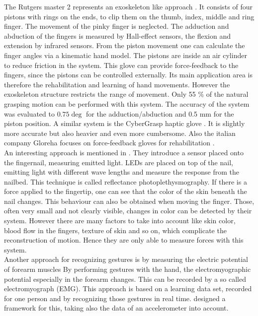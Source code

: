 {The Rutgers master {2} represents an exoskeleton like approach \cite{bouzit2002rutgers}. It consists of four pistons with rings on the ends, to clip them on the thumb, index, middle and ring finger. The movement of the pinky finger is neglected. The adduction and abduction of the fingers is measured by Hall-effect sensors, the flexion and extension by infrared sensors. From the piston movement one can calculate the finger angles via a kinematic hand model. The pistons are inside an air cylinder to reduce friction in the system. This glove can provide force-feedback to the fingers, since the pistons can be controlled externally. Its main application area is therefore the rehabilitation and learning of hand movements. However the exoskeleton structure restricts the range of movement. Only 55 \% of the natural grasping motion can be performed with this system. The accuracy of the system was evaluated to $ 0.75\deg  $ for the adduction/abduction and 0.5 mm for the piston position. A similar system is the CyberGrasp haptic glove \cite{cyberglove}. It is slightly more accurate but also heavier and even more cumbersome. Also the italian company Gloreha focuses on force-feedback gloves for rehabilitation \cite{Gloreha}.\\
An interesting approach is mentioned in \cite{mascaro2001photoplethysmograph}. They introduce a sensor placed onto the fingernail, measuring emitted light. LEDs are placed on top of the nail, emitting light with different wave lengths and measure the response from the nailbed. This technique is called reflectance photoplethysmography. If there is a force applied to the fingertip, one can see that the color of the skin beneath the nail changes. This behaviour can also be obtained when moving the finger. Those, often very small and not clearly visible, changes in color can be detected by their system. However there are many factors to take into account like skin color, blood flow in the fingers, texture of skin and so on, which complicate the reconstruction of motion. Hence they are only able to measure forces with this system.\\
Another approach for recognizing gestures is by measuring the electric potential of forearm muscles \cite{kim2008emg} By performing gestures with the hand, the electromyographic potential especially in the forearm changes. This can be recorded by a so called electromyograph (EMG). This approach is based on a learning data set, recorded for one person and by recognizing those gestures in real time. \cite{zhang2011framework} designed a framework for this, taking also the data of an accelerometer into account.

}
